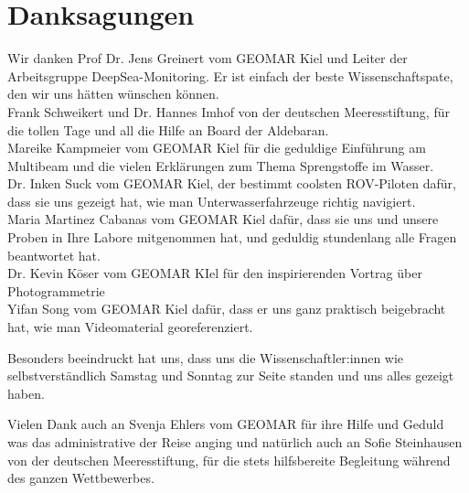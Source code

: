  

\chapter[Danksagungen]{Danksagungen}
Wir danken Prof Dr. Jens Greinert vom GEOMAR Kiel und Leiter der Arbeitsgruppe DeepSea-Monitoring. Er ist einfach der beste Wissenschaftspate, den wir uns hätten wünschen können.\\


Frank Schweikert und Dr. Hannes Imhof von der deutschen Meeresstiftung, für die tollen Tage und all die Hilfe an Board der Aldebaran. \\


Mareike Kampmeier vom GEOMAR Kiel für die geduldige Einführung am Multibeam und die vielen Erklärungen zum Thema Sprengstoffe im Wasser. \\


Dr. Inken Suck vom GEOMAR Kiel, der bestimmt coolsten ROV-Piloten dafür, dass sie uns gezeigt hat, wie man Unterwasserfahrzeuge richtig navigiert. \\


Maria Martinez Cabanas vom GEOMAR Kiel dafür, dass sie uns und unsere Proben in Ihre Labore mitgenommen hat, und geduldig stundenlang alle Fragen beantwortet hat.\\

Dr. Kevin Köser vom GEOMAR KIel für den inspirierenden Vortrag über Photogrammetrie \\

Yifan Song vom GEOMAR Kiel dafür, dass er uns ganz praktisch beigebracht hat, wie man Videomaterial georeferenziert.

Besonders beeindruckt hat uns, dass uns die Wissenschaftler:innen wie selbstverständlich Samstag und Sonntag zur Seite standen und uns alles gezeigt haben.

Vielen Dank auch an Svenja Ehlers vom GEOMAR für ihre Hilfe und Geduld was das administrative der Reise anging und natürlich auch an Sofie Steinhausen von der deutschen Meeresstiftung, für die stets hilfsbereite Begleitung während des ganzen Wettbewerbes.





